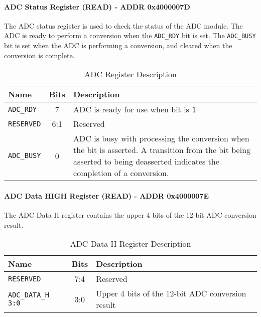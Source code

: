 \documentclass[main.tex]{subfiles}
\begin{document}
\paragraph{ADC Status Register (READ) - ADDR 0x4000007D}
The ADC status register is used to check the status of the ADC module. The ADC is ready to perform a conversion when the \texttt{ADC\_RDY} bit is set. The \texttt{ADC\_BUSY} bit is set when the ADC is performing a conversion, and cleared when the conversion is complete.
\begin{table}[h!]
    \centering
    \begin{tabular}{|l|c|p{10cm}|}
        \hline
        \textbf{Name} & \textbf{Bits} & \textbf{Description} \\ \hline
        \texttt{ADC\_RDY} & 7 & ADC is ready for use when bit is \texttt{1} \\ \hline
        \texttt{RESERVED} & 6:1 & Reserved \\ \hline
        \texttt{ADC\_BUSY} & 0 & ADC is busy with processing the conversion when the bit is asserted. A transition from the bit being asserted to being deasserted indicates the completion of a conversion. \\ \hline
    \end{tabular}
    \caption{ADC Register Description}
    \label{tab:adc_status_register}
\end{table}
\newpage
\paragraph{ADC Data HIGH Register (READ) - ADDR 0x4000007E}
The ADC Data H register contains the upper 4 bits of the 12-bit ADC conversion result.
\begin{table}[h!]
    \centering
    \begin{tabular}{|l|c|p{10cm}|}
        \hline
        \textbf{Name} & \textbf{Bits} & \textbf{Description} \\ \hline
        \texttt{RESERVED} & 7:4 & Reserved \\ \hline
        \texttt{ADC\_DATA\_H 3:0} & 3:0 & Upper 4 bits of the 12-bit ADC conversion result \\ \hline
    \end{tabular}
    \caption{ADC Data H Register Description}
    \label{tab:adc_data_h_register}
\end{table}
\end{document}
